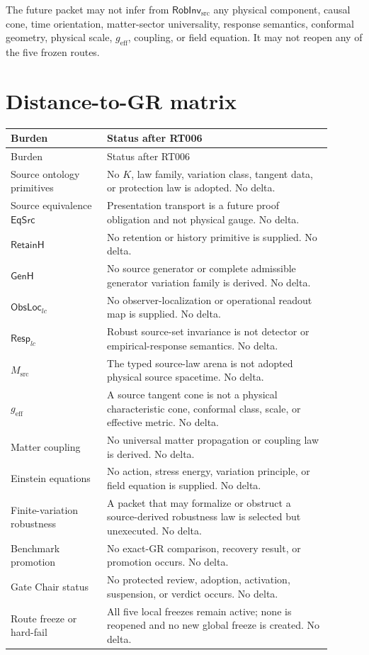 \documentclass[11pt]{article}
\newcommand{\RobInv}{\mathsf{RobInv}_{\mathrm{src}}}
\begin{document}
The future packet may not infer from \(\RobInv\) any physical component,
causal cone, time orientation, matter-sector universality, response semantics,
conformal geometry, physical scale, \(g_{\mathrm{eff}}\), coupling, or field
equation.  It may not reopen any of the five frozen routes.

\section{Distance-to-GR matrix}

\begin{longtable}{P{0.27\linewidth}P{0.63\linewidth}}
\toprule
Burden & Status after RT006 \\
\midrule
\endfirsthead
\toprule
Burden & Status after RT006 \\
\midrule
\endhead
Source ontology primitives & No \(K\), law family, variation class, tangent
data, or protection law is adopted.  No delta.\\
Source equivalence \(\mathsf{EqSrc}\) & Presentation transport is a future
proof obligation and not physical gauge.  No delta.\\
\(\mathsf{RetainH}\) & No retention or history primitive is supplied.  No
delta.\\
\(\mathsf{GenH}\) & No source generator or complete admissible generator
variation family is derived.  No delta.\\
\(\mathsf{ObsLoc}_{lc}\) & No observer-localization or operational readout
map is supplied.  No delta.\\
\(\mathsf{Resp}_{lc}\) & Robust source-set invariance is not detector or
empirical-response semantics.  No delta.\\
\(M_{\mathrm{src}}\) & The typed source-law arena is not adopted physical
source spacetime.  No delta.\\
\(g_{\mathrm{eff}}\) & A source tangent cone is not a physical characteristic
cone, conformal class, scale, or effective metric.  No delta.\\
Matter coupling & No universal matter propagation or coupling law is derived.
No delta.\\
Einstein equations & No action, stress energy, variation principle, or field
equation is supplied.  No delta.\\
Finite-variation robustness & A packet that may formalize or obstruct a
source-derived robustness law is selected but unexecuted.  No delta.\\
Benchmark promotion & No exact-GR comparison, recovery result, or promotion
occurs.  No delta.\\
Gate Chair status & No protected review, adoption, activation, suspension, or
verdict occurs.  No delta.\\
Route freeze or hard-fail & All five local freezes remain active; none is
reopened and no new global freeze is created.  No delta.\\
\bottomrule
\end{longtable}
\end{document}
